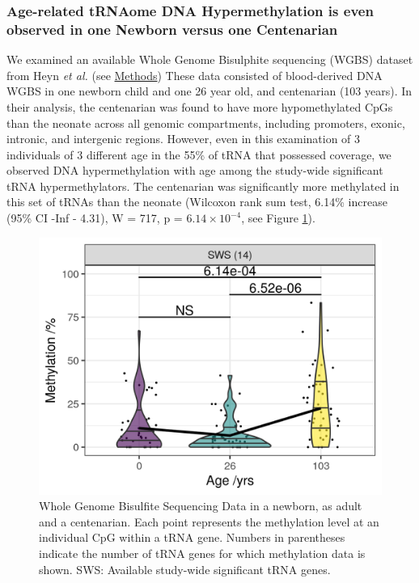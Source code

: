 \documentclass[]{book}
\begin{document}
\hypertarget{age-related-trnaome-dna-hypermethylation-is-even-observed-in-one-newborn-versus-one-centenarian}{%
\subsubsection{Age-related tRNAome DNA Hypermethylation is even observed in one Newborn versus one Centenarian}\label{age-related-trnaome-dna-hypermethylation-is-even-observed-in-one-newborn-versus-one-centenarian}}

We examined an available Whole Genome Bisulphite sequencing (WGBS) dataset from Heyn \emph{et al.} \citep{Heyn2012} (see \protect\hyperlink{Methods}{Methods})
These data consisted of blood-derived DNA WGBS in one newborn child and one 26 year old, and centenarian (103 years).
In their analysis, the centenarian was found to have more hypomethylated CpGs than the neonate across all genomic compartments, including promoters, exonic, intronic, and intergenic regions.
However, even in this examination of 3 individuals of 3 different age in the 55\% of tRNA that possessed coverage, we observed DNA hypermethylation with age among the study-wide significant tRNA hypermethylators. The centenarian was significantly more methylated in this set of tRNAs than the neonate (Wilcoxon rank sum test, 6.14\% increase (95\% CI -Inf - 4.31), W = 717, p = \(6.14\times10^{-4}\), see Figure \ref{fig:heyn}).

\begin{figure}

{\centering \includegraphics[width=0.6\linewidth]{./figs/heynViolinBBswsOnlyLabelled_BL} 

}

\caption{Whole Genome Bisulfite Sequencing Data in a newborn, as adult and a centenarian. Each point represents the methylation level at an individual CpG within a tRNA gene. Numbers in parentheses indicate the number of tRNA genes for which methylation data is shown. SWS: Available study-wide significant tRNA genes.}\label{fig:heyn}
\end{figure}
\end{document}

